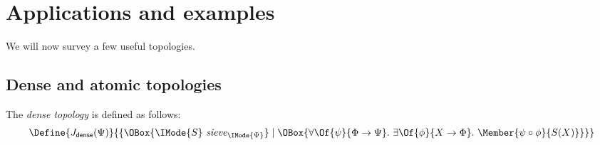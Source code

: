 \documentclass{article}
\newcommand\IsSieve[2]{\IMode{#2}\ \mathit{sieve}_{\IMode{#1}}}
\newcommand\JDense{J_{\mathsf{dense}}}
\newcommand\MkSet[1]{\{#1\}}
\begin{document}
\newpage
\section{Applications and examples}

We will now survey a few useful topologies.

\subsection{Dense and atomic topologies}

\begin{definition}
  The \emph{dense topology} is defined as follows:
  \[
    \Define{
      \JDense(\Psi)
    }{
      \MkSet{
        \OBox{
          \IsSieve{\Psi}{S}
        }
        \mid
        \OBox{
          \forall\Of{\psi}{\Phi\to\Psi}.\
          \exists\Of{\phi}{X\to\Phi}.\
          \Member{\psi\circ \phi}{S(X)}
        }
      }
    }
  \]
\end{definition}
\end{document}

